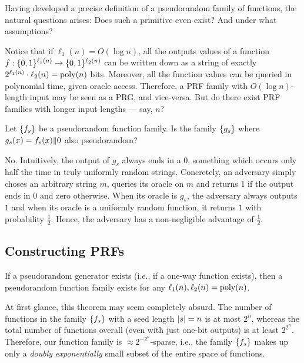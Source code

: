 \documentclass[11pt]{article}
\begin{document}
Having developed a precise definition of a pseudorandom family of
functions, the natural questions arises: Does such a primitive even
exist?  And under what assumptions?

Notice that if $\ell_{1}(n) = O(\log n)$, all the outputs values of a
function $f : \{0,1\}^{\ell_{1}(n)} \to \{0,1\}^{\ell_{2}(n)}$ can be
written down as a string of exactly $2^{\ell_{1}(n)} \cdot \ell_{2}(n)
= \operatorname{poly}(n)$ bits.  Moreover, all the function values can be queried in
polynomial time, given oracle access.  Therefore, a PRF family with
$O(\log n)$-length input may be seen as a PRG, and vice-versa.  But do
there exist PRF families with longer input lengths --- say, $n$?

\begin{question}
  Let \(\{f_s\}\) be a pseudorandom function family. Is the family
  \(\{g_s\}\) where \(g_s(x) = f_s(x) \| 0\) also pseudorandom?
\end{question}
  
\begin{answer}
  No. Intuitively, the output of \(g_s\) always ends in a 0, something
  which occurs only half the time in truly uniformly random
  strings. Concretely, an adversary simply choses an arbitrary string
  \(m\), queries its oracle on \(m\) and returns 1 if the output ends
  in 0 and zero otherwise. When its oracle is \(g_s\), the adversary
  always outputs \(1\) and when its oracle is a uniformly random
  function, it returns \(1\) with probability \(\frac{1}{2}\). Hence,
  the adversary has a non-negligible advantage of \(\frac{1}{2}\).
\end{answer}

\subsection{Constructing PRFs}
\label{sec:constructing-prfs}

\begin{theorem}
  \label{thm:prg-implies-prf}
  If a pseudorandom generator exists (i.e., if a one-way function
  exists), then a pseudorandom function family exists for any
  $\ell_{1}(n), \ell_{2}(n) = \operatorname{poly}(n)$.
\end{theorem}

At first glance, this theorem may seem completely absurd.  The number
of functions in the family $\{f_{s}\}$ with a seed length $\lvert s\rvert =
n$ is at most $2^n$, whereas the total number of functions overall
(even with just one-bit outputs) is at least $2^{2^{n}}$.  Therefore,
our function family is $\approx 2^{-2^{n}}$-sparse, i.e., the family
$\{f_s\}$ makes up only a \emph{doubly exponentially} small subset
of the entire space of functions.
\end{document}
